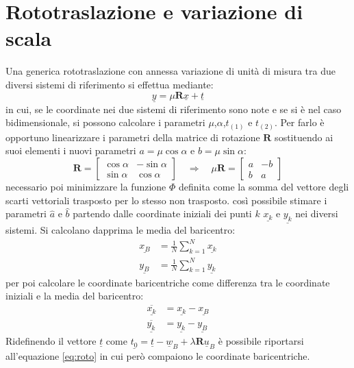 \chapter{Rototraslazione e variazione di scala}\label{cap:cap3}
Una generica rototraslazione con annessa variazione di unità di misura tra due diversi sistemi di riferimento si effettua mediante:
\begin{equation}
	\label{eq:roto}
	\underline{y}=\mu \mathbf{R} \underline{x}+\underline{t}
\end{equation}
in cui, se le coordinate nei due sistemi di riferimento sono note e se si è nel caso bidimensionale, si possono calcolare i parametri $\mu$,$\alpha$,$t_{(1)}$ e $t_{(2)}$.
Per farlo è opportuno linearizzare i parametri della matrice di rotazione $\mathbf{R}$ sostituendo ai suoi elementi i nuovi parametri $a=\mu\cos\alpha$ e $b=\mu\sin\alpha$:
\[
\mathbf{R}=
\begin{bmatrix}
\cos\alpha & -\sin\alpha \\ 
\sin\alpha & \cos\alpha
\end{bmatrix} 
\quad \Longrightarrow \quad
\mu \mathbf{R} = 
\begin{bmatrix}
a & -b \\ 
b & a
\end{bmatrix} 
\]
\e necessario poi minimizzare la funzione $\Phi$ definita come la somma del vettore degli scarti vettoriali trasposto per lo stesso non trasposto.
\e così possibile stimare i parametri $\hat{a}$ e $\hat{b}$ partendo dalle coordinate iniziali dei punti $k$ $\underline{x_k}$ e $\underline{y_k}$ nei diversi sistemi.
Si calcolano dapprima le media del baricentro:
\begin{align}
\label{eq:media}
\underline{x_B} &= \frac{1}{N}\sum_{k=1}^{N}\underline{x_k}\\
\underline{y_B} &= \frac{1}{N}\sum_{k=1}^{N}\underline{y_k}
\end{align}
per poi calcolare le coordinate baricentriche come differenza tra le coordinate iniziali e la media del baricentro:
\begin{align}
\overline{\underline{x_k}} &= \underline{x_k} - \underline{x_B}\\
\label{eq:baricentriche}
\overline{\underline{y_k}} &= \underline{y_k} - \underline{y_B}
\end{align}
Ridefinendo il vettore $\underline{t}$ come $\underline{t_{0}}=\underline{t}-\underline{w}_{B}+\lambda \mathbf{R} \underline{u}_{B}$ è possibile riportarsi all'equazione \ref{eq:roto} in cui però compaiono le coordinate baricentriche.
